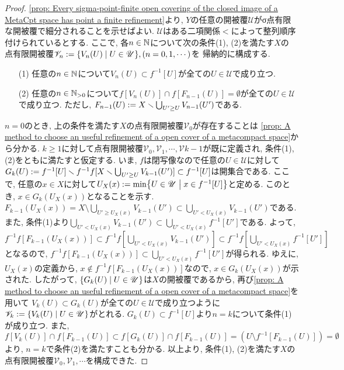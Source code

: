 \documentclass[uplatex, dvipdfmx, a4paper, 12pt, class=jsbook, crop=false]{standalone}
\begin{document}
\begin{proof}
	\cref{prop: Every sigma-point-finite open covering of the closed image of a MetaCpt space 
	has point a finite refinement}より,
	$ Y $の任意の開被覆$ \mathscr{U} $がσ点有限な開被覆で細分されることを示せばよい.
	$ \mathscr{U} $はある二項関係$ < $によって整列順序付けられているとする.
	ここで, 各$ n \in \mathbb{N} $について次の条件(1), (2)を満たす$ X $の
	点有限開被覆$ \mathscr{V}_n \defeq \setcomp{V_n(U)}{U \in \mathscr{U}}, (n=0, 1, \cdots) $を
	帰納的に構成する.
	\begin{enumerate}
		\item[(1)] 任意の$ n \in \mathbb{N} $について$ V_n(U) \subset f^{-1}[U] $が全ての$ U \in \mathscr{U} $で成り立つ.
		\item[(2)] 任意の$ n \in \mathbb{N}_{>0} $について$ f[V_n(U)] \cap f[F_{n-1}(U)] = \emptyset $が全ての$ U \in \mathscr{U} $で成り立つ. 
		ただし, $ F_{n-1}(U) \mathrel{:=} X \smallsetminus \bigcup_{U' \geq U} V_{n-1}(U') $である. 
	\end{enumerate}
	$ n = 0 $のとき, 上の条件を満たす$ X $の点有限開被覆$ \mathscr{V}_0 $が存在することは
	\cref{prop: A method to choose an useful refinement of a open cover of a metacompact space}から分かる.
	$ k \geq 1 $に対して点有限開被覆$ \mathscr{V}_0, \mathscr{V}_1, \cdots, \mathscr{V}{k-1} $が既に定義され, 
	条件(1), (2)をともに満たすと仮定する.
	いま, $ f $は閉写像なので任意の$ U \in \mathscr{U} $に対して$ G_k(U) \mathrel{:=} f^{-1}[U] 
	\smallsetminus f^{-1}f[X \smallsetminus \bigcup_{U' \geq U} V_{k-1}(U')] \subset f^{-1}[U] $は開集合である.
	ここで, 任意の$ x \in X $に対して$ U_X(x) \defeq \min \setcomp{U \in \mathscr{U}}{x \in f^{-1}[U]} $と定める.
	このとき, $ x \in G_k(U_X(x)) $となることを示す.
	$ F_{k-1}(U_X(x)) = X \setminus \bigcup_{U' \geq U_X(x)} V_{k-1}(U') \subset \bigcup_{U' < U_X(x)} V_{k-1}(U') $である.
	また, 条件(1)より$ \bigcup_{U' < U_X(x)} V_{k-1}(U') \subset \bigcup_{U' < U_X(x)} f^{-1}[U'] $である.
	よって, $ f^{-1}f[F_{k-1}(U_X(x))] \subset f^{-1}f[\bigcup_{U' < U_X(x)} V_{k-1}(U')] 
	\subset f^{-1}f[\bigcup_{U' < U_X(x)} f^{-1}[U']] $となるので,
	$ f^{-1}f[F_{k-1}(U_X(x))] \subset \bigcup_{U' < U_X(x)} f^{-1}[U'] $が得られる.
	ゆえに, $ U_X(x) $の定義から, $ x \notin f^{-1}f[F_{k-1}(U_X(x))] $なので,
	$ x \in G_k(U_X(x)) $が示された. したがって, $ \setcomp{G_{k}(U)}{U \in \mathscr{U}} $は$ X $の開被覆であるから,
	再び\cref{prop: A method to choose an useful refinement of a open cover of a metacompact space}を用いて
	$ V_k(U) \subset G_k(U) $が全ての$ U \in \mathscr{U} $で成り立つように
	$ \mathscr{V}_k \defeq \setcomp{V_k(U)}{U \in \mathscr{U}} $がとれる.
	$ G_k(U) \subset f^{-1}[U] $より$ n = k $について条件(1)が成り立つ.
	また, $ f[V_k(U)] \cap f[F_{k-1}(U)] \subset f[G_k(U)] \cap f[F_{k-1}(U)] 
	= \left(U \setminus f^{-1}[F_{k-1}(U)] \right) = \emptyset $より, 
	$ n = k $で条件(2)を満たすことも分かる.
	以上より, 条件(1), (2)を満たす$ X $の点有限開被覆$ \mathscr{V}_0, \mathscr{V}_1, \cdots $を構成できた.


\end{proof}
\end{document}
